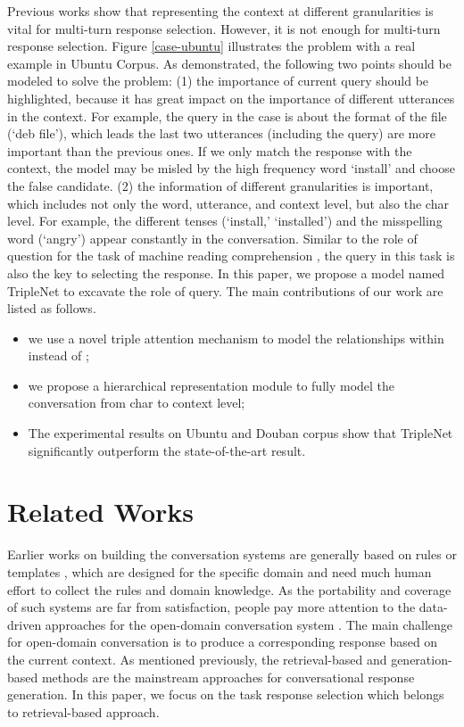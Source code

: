 \documentclass[11pt,a4paper]{article}
\begin{document}
 Previous works \cite{zhou-2018-multi,Wu-2017-Sequential} show that representing the context at different granularities is vital for multi-turn response selection.
 However, it is not enough for multi-turn response selection.  Figure \ref{case-ubuntu} illustrates the problem with a real example in Ubuntu Corpus.  
As demonstrated, the following two points should be modeled to solve the problem:
 (1) the importance of current query should be highlighted, because it has great impact on the importance of different utterances in the context.
 For example, the query in the case is about the format of the file (`deb file'), which leads the last two utterances (including the query) are more important than the previous ones. If we only match the response with the context, the model may be misled by the high frequency word `install' and choose the false candidate.
 (2) the information of different granularities is important, which includes not only the word, utterance, and context level, but also the char level. For example, the different tenses (`install,' `installed') and the misspelling word (`angry') appear constantly in the conversation.  
 Similar to the role of question for the task of machine reading comprehension \cite{seo-2016-bidirectional, cui-acl2017-aoa, chen-2019-convolutional}, the query in this task is also the key to selecting the response.
In this paper, we propose a model named TripleNet to excavate the role of query. The main contributions of our work are listed as follows.
 \begin {itemize}
 \item we use a novel triple attention mechanism to model the relationships within  instead of ; 
 \item we propose a hierarchical representation module to fully model the conversation from char to context level;  
 \item The experimental results on Ubuntu and Douban corpus show that TripleNet significantly outperform the state-of-the-art result.
 \end {itemize}


\section{Related Works}\label{related-works}
Earlier works on building the conversation systems are generally based on rules or templates \cite {Walker-2001-Quantitative}, which are designed for the specific domain and need much human effort to collect the rules and domain knowledge. 
As the portability and coverage of such systems are far from satisfaction, people pay more attention to the data-driven approaches for the 
open-domain conversation system \cite{Ritter-2011-Data, Higashinaka-2014-Towards}. 
The main challenge for open-domain conversation is to produce a corresponding response based on the current context. 
As mentioned previously, the retrieval-based and generation-based methods are the mainstream approaches for conversational response generation. In this paper, we focus on the task response selection which belongs to retrieval-based approach.
\end{document}
